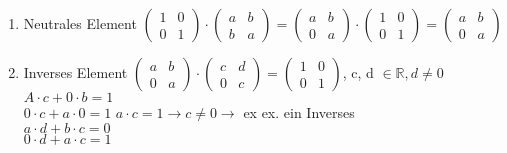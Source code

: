 \documentclass{scrartcl}
\begin{document}
\begin{enumerate}
	\item
	Neutrales Element $\begin{pmatrix}
		1 & 0 \\ 0 & 1
	\end{pmatrix} \cdot \begin{pmatrix}
		a & b \\ b & a
\end{pmatrix} = \begin{pmatrix}
	a & b \\ 0 & a
\end{pmatrix} \cdot \begin{pmatrix}
	1 & 0 \\ 0 & 1
\end{pmatrix} = \begin{pmatrix}
	a & b \\ 0 & a
\end{pmatrix}$
\item
Inverses Element $\begin{pmatrix}
	a & b \\ 0 & a
\end{pmatrix} \cdot \begin{pmatrix}
	c & d \\ 0 & c
\end{pmatrix} = \begin{pmatrix}
	1 & 0 \\ 0 & 1
\end{pmatrix}$, c, d $\in \mathbb{R}, d\not = 0$\\
$A \cdot c + 0\cdot b =1$\\
$0 \cdot c + a \cdot 0 = 1$ \hspace{2cm} $a \cdot c = 1 \rightarrow c \not = 0 \rightarrow$ ex ex. ein Inverses\\
$a \cdot d + b \cdot c = 0$\\
$0 \cdot d + a \cdot c = 1$


\end{enumerate}
\end{document}
